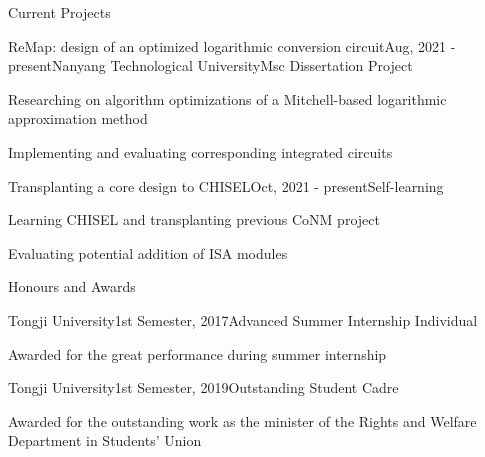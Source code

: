 \documentclass{resume} %
\begin{document}
\begin{rSection}{Current Projects}
	
	\begin{rSubsection}{ReMap: design of an optimized logarithmic conversion circuit}{Aug, 2021 - present}{Nanyang Technological University}{Msc Dissertation Project}
		\item Researching on algorithm optimizations of a Mitchell-based logarithmic approximation method
		\item Implementing and evaluating corresponding integrated circuits
	\end{rSubsection}

\newpage
	
	\begin{rSubsection}{Transplanting a core design to CHISEL}{Oct, 2021 - present}{Self-learning}{}
		\item Learning CHISEL and transplanting previous CoNM project
		\item Evaluating potential addition of ISA modules
	\end{rSubsection}

\end{rSection}

\begin{rSection}{Honours and Awards}
	
	\begin{rSubsection}{Tongji University}{1st Semester, 2017}{Advanced Summer Internship Individual}{}
		\item Awarded for the great performance during summer internship
	\end{rSubsection}
		
	\begin{rSubsection}{Tongji University}{1st Semester, 2019}{Outstanding Student Cadre}{}
		\item Awarded for the outstanding work as the minister of the Rights and Welfare Department in Students' Union
	\end{rSubsection}

\end{rSection}
\end{document}

